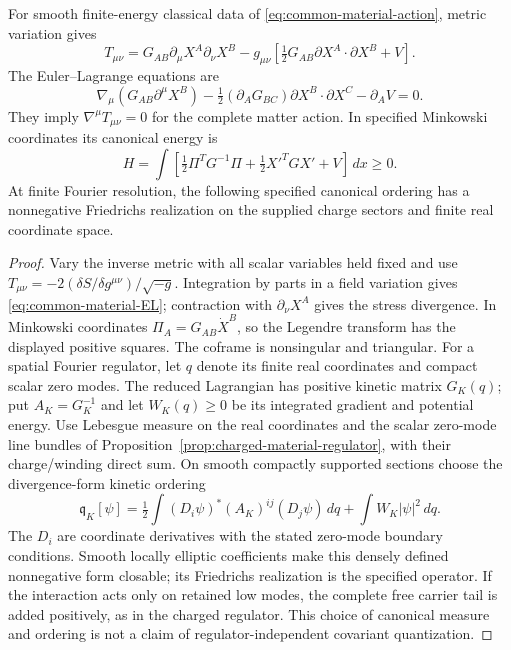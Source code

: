 \begin{proposition}
\label{prop:common-material-action}
For smooth finite-energy classical data of
\eqref{eq:common-material-action}, metric variation gives
\begin{equation}
 T_{\mu\nu}=G_{AB}\partial_\mu X^A\partial_\nu X^B
 -g_{\mu\nu}[\tfrac12G_{AB}\partial X^A\cdot\partial X^B+V].
 \label{eq:common-material-stress}
\end{equation}
The Euler--Lagrange equations are
\begin{equation}
 \nabla_\mu(G_{AB}\partial^\mu X^B)
 -\tfrac12(\partial_AG_{BC})\partial X^B\cdot\partial X^C
 -\partial_AV=0 .
 \label{eq:common-material-EL}
\end{equation}
They imply $\nabla^\mu T_{\mu\nu}=0$ for the complete matter action.
In specified Minkowski coordinates its canonical energy is
\[
 H=\int[\tfrac12\Pi^TG^{-1}\Pi
           +\tfrac12X'^TGX'+V]\,dx\ge0 .
\]
At finite Fourier resolution, the following specified canonical
ordering has a nonnegative Friedrichs realization on the supplied
charge sectors and finite real coordinate space.
\end{proposition}
\begin{proof}
Vary the inverse metric with all scalar variables held fixed and use
$T_{\mu\nu}=-2(\delta S/\delta g^{\mu\nu})/\sqrt{-g}$.
Integration by parts in a field variation gives
\eqref{eq:common-material-EL}; contraction with $\partial_\nu X^A$
gives the stress divergence. In Minkowski coordinates
$\Pi_A=G_{AB}\dot X^B$, so the Legendre transform has the displayed
positive squares. The coframe is nonsingular and triangular.
For a spatial Fourier regulator, let $q$ denote its finite real
coordinates and compact scalar zero modes. The reduced Lagrangian has
positive kinetic matrix $G_K(q)$; put $A_K=G_K^{-1}$ and let
$W_K(q)\ge0$ be its integrated gradient and potential energy.
Use Lebesgue measure on the real coordinates and the scalar zero-mode
line bundles of Proposition~\ref{prop:charged-material-regulator},
with their charge/winding direct sum. On smooth compactly supported
sections choose the divergence-form kinetic ordering
\[
 \mathfrak q_K[\psi]=\tfrac12\int
       (D_i\psi)^*(A_K)^{ij}(D_j\psi)\,dq
                     +\int W_K|\psi|^2\,dq .
\]
The $D_i$ are coordinate derivatives with the stated zero-mode boundary
conditions. Smooth locally elliptic coefficients make this densely
defined nonnegative form closable; its Friedrichs realization is the
specified operator. If the interaction acts only on retained low modes,
the complete free carrier tail is added positively, as in the charged
regulator. This choice of canonical measure and ordering is not a
claim of regulator-independent covariant quantization.
\end{proof}

